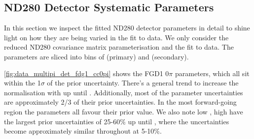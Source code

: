 \subsection{ND280 Detector Systematic Parameters}
In this section we inspect the fitted ND280 detector parameters in detail to shine light on how they are being varied in the fit to data. We only consider the reduced ND280 covariance matrix parameterisation and the fit to data. The parameters are sliced into bins of \cosmu (primary) and \pmu (secondary).

\autoref{fig:data_multipi_det_fdg1_cc0pi} shows the FGD1 0$\pi$ parameters, which all sit within the 1$\sigma$ of the prior uncertainty. There's a general trend to increase the normalisation with \pmu up until . Additionally, most of the parameter uncertainties are approximately 2/3 of their prior uncertainties. In the most forward-going region the parameters all favour their prior value. We also note low \cosmu, high \pmu have the largest prior uncertainties of 25-60\% up until , where the uncertainties become approximately similar throughout \pmu at 5-10\%.
